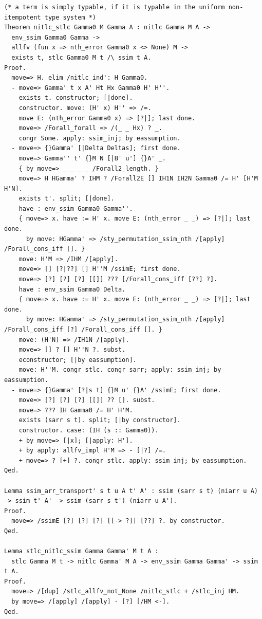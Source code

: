 \begin{lstlisting}[style=authorcoq]
(* a term is simply typable, if it is typable in the uniform non-itempotent type system *)
Theorem nitlc_stlc Gamma0 M Gamma A : nitlc Gamma M A ->
  env_ssim Gamma0 Gamma ->
  allfv (fun x => nth_error Gamma0 x <> None) M ->
  exists t, stlc Gamma0 M t /\ ssim t A.
Proof.
  move=> H. elim /nitlc_ind': H Gamma0.
  - move=> Gamma' t x A' Ht Hx Gamma0 H' H''.
    exists t. constructor; [|done].
    constructor. move: (H' x) H'' => /=.
    move E: (nth_error Gamma0 x) => [?|]; last done.
    move=> /Forall_forall => /(_ _ Hx) ? _.
    congr Some. apply: ssim_inj; by eassumption.
  - move=> {}Gamma' [|Delta Deltas]; first done.
    move=> Gamma'' t' {}M N [|B' u'] {}A' _.
    { by move=> _ _ _ _ /Forall2_length. }
    move=> H HGamma' ? IHM ? /Forall2E [] IH1N IH2N Gamma0 /= H' [H'M H'N].
    exists t'. split; [|done].
    have : env_ssim Gamma0 Gamma''.
    { move=> x. have := H' x. move E: (nth_error _ _) => [?|]; last done.
      by move: HGamma' => /sty_permutation_ssim_nth /[apply] /Forall_cons_iff []. }
    move: H'M => /IHM /[apply].
    move=> [] [?|??] [] H''M /ssimE; first done.
    move=> [?] [?] [?] [[]] ??? [/Forall_cons_iff [??] ?].
    have : env_ssim Gamma0 Delta.
    { move=> x. have := H' x. move E: (nth_error _ _) => [?|]; last done.
      by move: HGamma' => /sty_permutation_ssim_nth /[apply] /Forall_cons_iff [?] /Forall_cons_iff []. }
    move: (H'N) => /IH1N /[apply].
    move=> [] ? [] H''N ?. subst.
    econstructor; [|by eassumption].
    move: H''M. congr stlc. congr sarr; apply: ssim_inj; by eassumption.
  - move=> {}Gamma' [?|s t] {}M u' {}A' /ssimE; first done.
    move=> [?] [?] [?] [[]] ?? []. subst.
    move=> ??? IH Gamma0 /= H' H'M.
    exists (sarr s t). split; [|by constructor].
    constructor. case: (IH (s :: Gamma0)).
    + by move=> [|x]; [|apply: H'].
    + by apply: allfv_impl H'M => - [|?] /=.
    + move=> ? [+] ?. congr stlc. apply: ssim_inj; by eassumption.
Qed.

Lemma ssim_arr_transport' s t u A t' A' : ssim (sarr s t) (niarr u A) -> ssim t' A' -> ssim (sarr s t') (niarr u A').
Proof.
  move=> /ssimE [?] [?] [?] [[-> ?]] [??] ?. by constructor.
Qed.

Lemma stlc_nitlc_ssim Gamma Gamma' M t A :
  stlc Gamma M t -> nitlc Gamma' M A -> env_ssim Gamma Gamma' -> ssim t A.
Proof.
  move=> /[dup] /stlc_allfv_not_None /nitlc_stlc + /stlc_inj HM.
  by move=> /[apply] /[apply] - [?] [/HM <-].
Qed.


\end{lstlisting}
